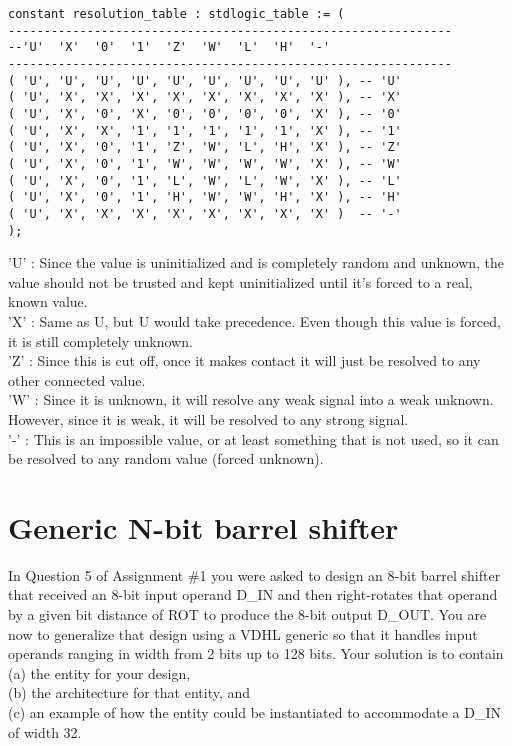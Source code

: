 \documentclass{article}
\begin{document}
\begin{verbatim}
constant resolution_table : stdlogic_table := (
--------------------------------------------------------------
--'U'  'X'  '0'  '1'  'Z'  'W'  'L'  'H'  '-'
--------------------------------------------------------------
( 'U', 'U', 'U', 'U', 'U', 'U', 'U', 'U', 'U' ), -- 'U'
( 'U', 'X', 'X', 'X', 'X', 'X', 'X', 'X', 'X' ), -- 'X'
( 'U', 'X', '0', 'X', '0', '0', '0', '0', 'X' ), -- '0'
( 'U', 'X', 'X', '1', '1', '1', '1', '1', 'X' ), -- '1'
( 'U', 'X', '0', '1', 'Z', 'W', 'L', 'H', 'X' ), -- 'Z'
( 'U', 'X', '0', '1', 'W', 'W', 'W', 'W', 'X' ), -- 'W'
( 'U', 'X', '0', '1', 'L', 'W', 'L', 'W', 'X' ), -- 'L'
( 'U', 'X', '0', '1', 'H', 'W', 'W', 'H', 'X' ), -- 'H'
( 'U', 'X', 'X', 'X', 'X', 'X', 'X', 'X', 'X' )  -- '-'
);
\end{verbatim} 
'U' : Since the value is uninitialized and is completely random and unknown, the value should not be trusted and kept uninitialized until it's forced to a real, known value. \\
'X' : Same as U, but U would take precedence. Even though this value is forced, it is still completely unknown. \\
'Z' : Since this is cut off, once it makes contact it will just be resolved to any other connected value. \\
'W' : Since it is unknown, it will resolve any weak signal into a weak unknown. However, since it is weak, it will be resolved to any strong signal. \\
'-' : This is an impossible value, or at least something that is not used, so it can be resolved to any random value (forced unknown). \\

\section{Generic N-bit barrel shifter}

\begin{displayquote}
In Question 5 of Assignment \#1 you were asked to design an 8-bit barrel shifter that received an 8-bit input operand D\_IN and then right-rotates that operand by a given bit distance of ROT to produce the 8-bit output D\_OUT. You are now to generalize that design using a VDHL generic so that it handles input operands ranging in width from 2 bits up to 128 bits. Your solution is to contain \\
(a) the entity for your design, \\ 
(b) the architecture for that entity, and \\
(c) an example of how the entity could be instantiated to accommodate a D\_IN  of width 32.
\end{displayquote}
\end{document}
